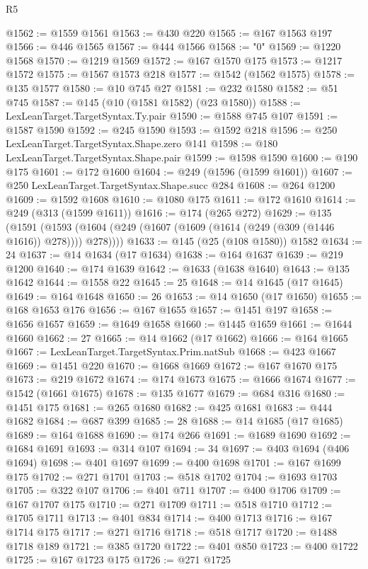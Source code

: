 \begin{lexlean}{R5}
\begin{coremodule}
@1562 := @1559 @1561
@1563 := @430 @220
@1565 := @167 @1563 @197
@1566 := @446 @1565
@1567 := @444 @1566
@1568 := "0"
@1569 := @1220 @1568
@1570 := @1219 @1569
@1572 := @167 @1570 @175
@1573 := @1217 @1572
@1575 := @1567 @1573 @218
@1577 := @1542 (@1562 @1575)
@1578 := @135 @1577
@1580 := @10 @745 @27
@1581 := @232 @1580
@1582 := @51 @745
@1587 := @145 (@10 (@1581 @1582) (@23 @1580))
@1588 := LexLeanTarget.TargetSyntax.Ty.pair
@1590 := @1588 @745 @107
@1591 := @1587 @1590
@1592 := @245 @1590
@1593 := @1592 @218
@1596 := @250 LexLeanTarget.TargetSyntax.Shape.zero @141
@1598 := @180 LexLeanTarget.TargetSyntax.Shape.pair
@1599 := @1598 @1590
@1600 := @190 @175
@1601 := @172 @1600
@1604 := @249 (@1596 (@1599 @1601))
@1607 := @250 LexLeanTarget.TargetSyntax.Shape.succ @284
@1608 := @264 @1200
@1609 := @1592 @1608
@1610 := @1080 @175
@1611 := @172 @1610
@1614 := @249 (@313 (@1599 @1611))
@1616 := @174 (@265 @272)
@1629 := @135
    (@1591 (@1593 (@1604 (@249 (@1607 (@1609 (@1614 (@249 (@309 (@1446 @1616)) @278)))) @278))))
@1633 := @145 (@25 (@108 @1580)) @1582
@1634 := 24
@1637 := @14 @1634 (@17 @1634)
@1638 := @164 @1637
@1639 := @219 @1200
@1640 := @174 @1639
@1642 := @1633 (@1638 @1640)
@1643 := @135 @1642
@1644 := @1558 @22
@1645 := 25
@1648 := @14 @1645 (@17 @1645)
@1649 := @164 @1648
@1650 := 26
@1653 := @14 @1650 (@17 @1650)
@1655 := @168 @1653 @176
@1656 := @167 @1655
@1657 := @1451 @197
@1658 := @1656 @1657
@1659 := @1649 @1658
@1660 := @1445 @1659
@1661 := @1644 @1660
@1662 := 27
@1665 := @14 @1662 (@17 @1662)
@1666 := @164 @1665
@1667 := LexLeanTarget.TargetSyntax.Prim.natSub
@1668 := @423 @1667
@1669 := @1451 @220
@1670 := @1668 @1669
@1672 := @167 @1670 @175
@1673 := @219 @1672
@1674 := @174 @1673
@1675 := @1666 @1674
@1677 := @1542 (@1661 @1675)
@1678 := @135 @1677
@1679 := @684 @316
@1680 := @1451 @175
@1681 := @265 @1680
@1682 := @425 @1681
@1683 := @444 @1682
@1684 := @687 @399
@1685 := 28
@1688 := @14 @1685 (@17 @1685)
@1689 := @164 @1688
@1690 := @174 @266
@1691 := @1689 @1690
@1692 := @1684 @1691
@1693 := @314 @107
@1694 := 34
@1697 := @403 @1694 (@406 @1694)
@1698 := @401 @1697
@1699 := @400 @1698
@1701 := @167 @1699 @175
@1702 := @271 @1701
@1703 := @518 @1702
@1704 := @1693 @1703
@1705 := @322 @107
@1706 := @401 @711
@1707 := @400 @1706
@1709 := @167 @1707 @175
@1710 := @271 @1709
@1711 := @518 @1710
@1712 := @1705 @1711
@1713 := @401 @834
@1714 := @400 @1713
@1716 := @167 @1714 @175
@1717 := @271 @1716
@1718 := @518 @1717
@1720 := @1488 @1718 @189
@1721 := @385 @1720
@1722 := @401 @850
@1723 := @400 @1722
@1725 := @167 @1723 @175
@1726 := @271 @1725

\end{coremodule}
\end{lexlean}
